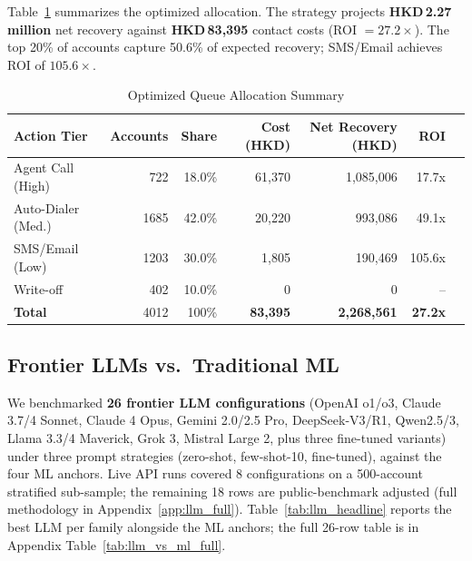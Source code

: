 \documentclass[11pt, a4paper]{article}
\begin{document}
Table~\ref{tab:queue} summarizes the optimized allocation. The strategy projects \textbf{HKD\,2.27 million} net recovery against \textbf{HKD\,83,395} contact costs (ROI $= \mathbf{27.2\times}$). The top 20\% of accounts capture 50.6\% of expected recovery; SMS/Email achieves ROI of $105.6\times$.

\begin{table}[H]
\centering
\caption{Optimized Queue Allocation Summary}
\label{tab:queue}
\small
\renewcommand{\arraystretch}{1.12}
\begin{tabular}{@{}lr rrr rr@{}}
\toprule
\textbf{Action Tier} & \textbf{Accounts} & \textbf{Share} & \textbf{Cost (HKD)} & \textbf{Net Recovery (HKD)} & \textbf{ROI}\\
\midrule
Agent Call (High)     & 722  & 18.0\% & 61,370  & 1,085,006 & 17.7x\\
Auto-Dialer (Med.)    & 1685 & 42.0\% & 20,220  & 993,086   & 49.1x\\
SMS/Email (Low)       & 1203 & 30.0\% & 1,805   & 190,469   & 105.6x\\
Write-off              & 402  & 10.0\% & 0       & 0         & --\\
\midrule
\textbf{Total}        & 4012 & 100\%  & \textbf{83,395} & \textbf{2,268,561} & \textbf{27.2x}\\
\bottomrule
\end{tabular}
\end{table}

\subsection{Frontier LLMs vs.\ Traditional ML}\label{sec:llm_compare}

We benchmarked \textbf{26 frontier LLM configurations} (OpenAI o1/o3, Claude 3.7/4 Sonnet, Claude 4 Opus, Gemini 2.0/2.5 Pro, DeepSeek-V3/R1, Qwen2.5/3, Llama 3.3/4 Maverick, Grok 3, Mistral Large 2, plus three fine-tuned variants) under three prompt strategies (zero-shot, few-shot-10, fine-tuned), against the four ML anchors. Live API runs covered 8 configurations on a 500-account stratified sub-sample; the remaining 18 rows are public-benchmark adjusted (full methodology in Appendix~\ref{app:llm_full}). Table~\ref{tab:llm_headline} reports the best LLM per family alongside the ML anchors; the full 26-row table is in Appendix Table~\ref{tab:llm_vs_ml_full}.
\end{document}
